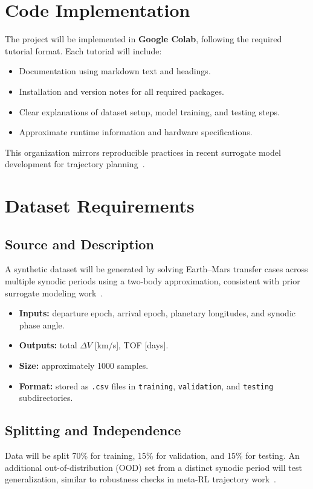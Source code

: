 \documentclass[conference]{IEEEtran}
\begin{document}
	\section{Code Implementation}
	The project will be implemented in \textbf{Google Colab}, following the required tutorial format. Each tutorial will include:
	\begin{itemize}
		\item Documentation using markdown text and headings.
		\item Installation and version notes for all required packages.
		\item Clear explanations of dataset setup, model training, and testing steps.
		\item Approximate runtime information and hardware specifications.
	\end{itemize}
	This organization mirrors reproducible practices in recent surrogate model development for trajectory planning~\cite{ruff2023surrogate}.
	
	\section{Dataset Requirements}
	\subsection{Source and Description}
	A synthetic dataset will be generated by solving Earth--Mars transfer cases across multiple synodic periods using a two-body approximation, consistent with prior surrogate modeling work~\cite{ruff2023surrogate}.
	\begin{itemize}
		\item \textbf{Inputs:} departure epoch, arrival epoch, planetary longitudes, and synodic phase angle.
		\item \textbf{Outputs:} total $\Delta V$ [km/s], TOF [days].
		\item \textbf{Size:} approximately 1000 samples.
		\item \textbf{Format:} stored as \texttt{.csv} files in \texttt{training}, \texttt{validation}, and \texttt{testing} subdirectories.
	\end{itemize}
	
	\subsection{Splitting and Independence}
	Data will be split 70\% for training, 15\% for validation, and 15\% for testing. An additional out-of-distribution (OOD) set from a distinct synodic period will test generalization, similar to robustness checks in meta-RL trajectory work~\cite{federici2024robust}.
	
\end{document}

